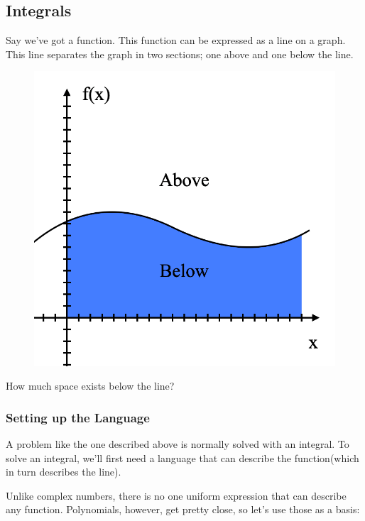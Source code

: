 


\subsection{Integrals}\label{sec:integrals}
Say we've got a function. This function can be expressed as a line on a graph. This line separates the graph in two sections; one above and one below the line.

\begin{figure}[h!]
    \centering
    \includegraphics[scale= 0.3]{Images/integralGraph.png}
    \caption{}
    \label{integralgraph}
\end{figure}

How much space exists below the line?

\subsubsection{Setting up the Language}
A problem like the one described above is normally solved with an integral. To solve an integral, we'll first need a language that can describe the function(which in turn describes the line).

Unlike complex numbers, there is no one uniform expression that can describe any function. Polynomials, however, get pretty close, so let's use those as a basis:

